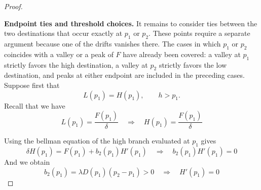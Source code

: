 \documentclass[11pt]{article}
\begin{document}
\begin{proof}
\begin{figure}[H]
\centering
{}
\end{figure}

\medskip\noindent\textbf{Endpoint ties and threshold choices.}
It remains to consider ties between the two destinations that occur exactly at $p_1$ or $p_2$. These points require a separate argument because one of the drifts vanishes there. The cases in which $p_1$ or $p_2$ coincides with a valley or a peak of $F$ have already been covered: a valley at $p_1$ strictly favors the high destination, a valley at $p_2$ strictly favors the low destination, and peaks at either endpoint are included in the preceding cases.
Suppose first that
\begin{equation*}
    L(p_1)=H(p_1),\qquad h>p_1.
\end{equation*}
Recall that we have 
\begin{equation}
    L(p_1)=\frac{F(p_1)}{\delta} \quad \Rightarrow \quad H(p_1) = \frac{F(p_1)}{\delta}
    \label{eq:tie}
\end{equation}

Using the bellman equation of the high branch evaluated at $p_1$ gives
\begin{equation*}
    \delta H(p_1)=F(p_1)+b_2(p_1)H'(p_1) \quad \Rightarrow \quad b_2(p_1)H'(p_1) = 0 
\end{equation*}
And we obtain
\begin{equation*}
    b_2(p_1)=\lambda D(p_1)(p_2-p_1)>0 \quad \Rightarrow \quad H'(p_1)=0
\end{equation*}


\end{proof}
\end{document}
